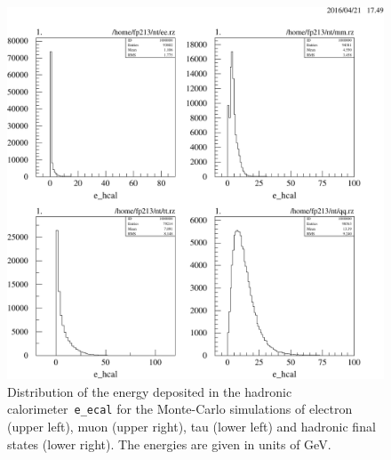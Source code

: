 \documentclass[11pt, a4paper]{article}
\numberwithin{equation}{section}
\begin{document}
\begin{appendix}
\begin{figure}[h]
	\centering
	\includegraphics[width=1\textwidth]{./data/tag2/uncut/cropped/e_hcal_uncut.pdf}
	\caption{Distribution of the energy deposited in the hadronic calorimeter~\texttt{e\_ecal} for the Monte-Carlo simulations of electron (upper left), muon (upper right), tau (lower left) and hadronic final states (lower right). The energies are given in units of GeV.}
\end{figure}


\end{appendix}
\end{document}
